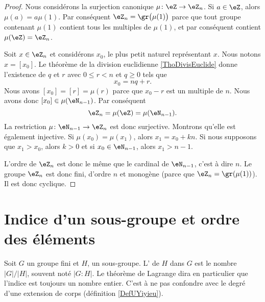 \begin{proof}
    Nous considérons la surjection canonique \( \mu\colon \eZ\to \eZ_n\). Si \( a\in\eZ\), alors \( \mu(a)=a\mu(1)\). Par conséquent \( \eZ_n=\gr\big( \mu(1) \big)\) parce que tout groupe contenant \( \mu(1)\) contient tous les multiples de \( \mu(1)\), et par conséquent contient \( \mu(\eZ)=\eZ_n\).

    Soit \( x\in\eZ_n\) et considérons \( x_0\), le plus petit naturel représentant \( x\). Nous notons \( x=[x_0]\). Le théorème de la division euclidienne \ref{ThoDivisEuclide} donne l'existence de \( q\) et \( r\) avec \( 0\leq r<n\) et \( q\geq 0\) tels que
    \begin{equation}
        x_0=nq+r.
    \end{equation}
    Nous avons \( [x_0]=[r]=\mu(r)\) parce que \( x_0-r\) est un multiple de \( n\). Nous avons donc \( [x_0]\in\mu(\eN_{n-1})\). Par conséquent
    \begin{equation}
        \eZ_n=\mu(\eZ)=\mu(\eN_{n-1}).
    \end{equation}
    La restriction \( \mu\colon \eN_{n-1}\to \eZ_n\) est donc surjective. Montrons qu'elle est également injective. Si \( \mu(x_0)=\mu(x_1)\), alors \( x_1=x_0+kn\). Si nous supposons que \( x_1>x_0\), alors \( k>0\) et si \( x_0\in\eN_{n-1}\), alors \( x_1>n-1\).

    L'ordre de \( \eZ_n\) est donc le même que le cardinal de \( \eN_{n-1}\), c'est à dire \( n\). Le groupe \( \eZ_n\) est donc fini, d'ordre \( n\) et monogène (parce que \( \eZ_n=\gr(\mu(1))\)). Il est donc cyclique.
\end{proof}

\section{Indice d'un sous-groupe et ordre des éléments}

Soit \( G\) un groupe fini et \( H\), un sous-groupe. L' de \( H\) dans \( G\) est le nombre \( | G |/| H |\), souvent noté \( | G:H |\). Le théorème de Lagrange dira en particulier que l'indice est toujours un nombre entier. C'est à ne pas confondre avec le degré d'une extension de corps (définition \ref{DefUYiyieu}).


